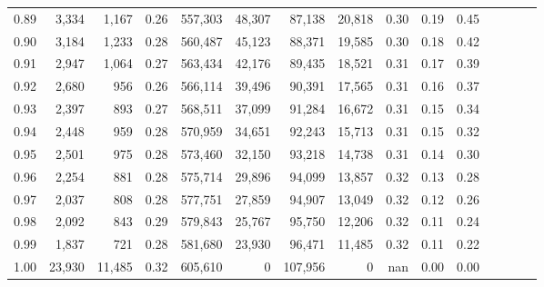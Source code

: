 \begin{tabular}{rrrcrrrrrrrrrrr}
0.89 &   3,334 &   1,167 &                                       0.26 &  557,303 &   48,307 &   87,138 &   20,818 &  0.30 &  0.19 &                         0.45 \\
0.90 &   3,184 &   1,233 &                                       0.28 &  560,487 &   45,123 &   88,371 &   19,585 &  0.30 &  0.18 &                         0.42 \\
0.91 &   2,947 &   1,064 &                                       0.27 &  563,434 &   42,176 &   89,435 &   18,521 &  0.31 &  0.17 &                         0.39 \\
0.92 &   2,680 &     956 &                                       0.26 &  566,114 &   39,496 &   90,391 &   17,565 &  0.31 &  0.16 &                         0.37 \\
0.93 &   2,397 &     893 &                                       0.27 &  568,511 &   37,099 &   91,284 &   16,672 &  0.31 &  0.15 &                         0.34 \\
0.94 &   2,448 &     959 &                                       0.28 &  570,959 &   34,651 &   92,243 &   15,713 &  0.31 &  0.15 &                         0.32 \\
0.95 &   2,501 &     975 &                                       0.28 &  573,460 &   32,150 &   93,218 &   14,738 &  0.31 &  0.14 &                         0.30 \\
0.96 &   2,254 &     881 &                                       0.28 &  575,714 &   29,896 &   94,099 &   13,857 &  0.32 &  0.13 &                         0.28 \\
0.97 &   2,037 &     808 &                                       0.28 &  577,751 &   27,859 &   94,907 &   13,049 &  0.32 &  0.12 &                         0.26 \\
0.98 &   2,092 &     843 &                                       0.29 &  579,843 &   25,767 &   95,750 &   12,206 &  0.32 &  0.11 &                         0.24 \\
0.99 &   1,837 &     721 &                                       0.28 &  581,680 &   23,930 &   96,471 &   11,485 &  0.32 &  0.11 &                         0.22 \\
1.00 &  23,930 &  11,485 &                                       0.32 &  605,610 &        0 &  107,956 &        0 &   nan &  0.00 &                         0.00 \\
\bottomrule
\end{tabular}
